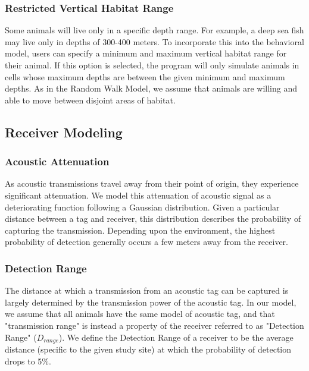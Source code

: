 \subsubsection{Restricted Vertical Habitat Range}
\label{restrictedVerticalHabitat}
Some animals will live only in a specific depth range.  For example, a deep sea fish may live only in depths of 300-400 meters.  To incorporate this into the behavioral model, users can specify a minimum and maximum vertical habitat range for their animal.  If this option is selected, the program will only simulate animals in cells whose maximum depths are between the given minimum and maximum depths.  As in the Random Walk Model, we assume that animals are willing and able to move between disjoint areas of habitat.


\subsection{Receiver Modeling}
\label{receiverModel}

\subsubsection{Acoustic Attenuation}
\label{acousticAttenuation}
As acoustic transmissions travel away from their point of origin, they experience significant attenuation.  We model this attenuation of acoustic signal as a deteriorating function following a Gaussian distribution.  Given a particular distance between a tag and receiver, this distribution describes the probability of capturing the transmission.  Depending upon the environment, the highest probability of detection generally occurs a few meters away from the receiver.

\subsubsection{Detection Range}
\label{detectionRange}
The distance at which a transmission from an acoustic tag can be captured is largely determined by the transmission power of the acoustic tag.  In our model, we assume that all animals have the same model of acoustic tag, and that "transmission range" is instead a property of the receiver referred to as "Detection Range" ($D_{range}$).  We define the Detection Range of a receiver to be the average distance (specific to the given study site) at which the probability of detection drops to 5\%.

